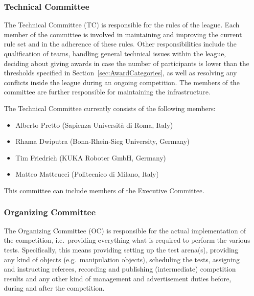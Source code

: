\subsubsection{\erlir Technical Committee}
\label{sssec:RoawTC}

The Technical Committee (TC) is responsible for the rules of the league. Each member of the committee is involved in maintaining and improving the current rule set and in the adherence of these rules. Other responsibilities include the qualification of teams, handling general technical issues within the league, deciding about giving awards in case the number of participants is lower than the thresholds specified in Section~\ref{sec:AwardCategories}, as well as resolving any conflicts inside the league during an ongoing competition. The members of the committee are further responsible for maintaining the \erlir infrastructure. 

The Technical Committee currently consists of the following members:
%
\begin{itemize}	\topsep-12pt\itemsep-2pt
\item Alberto Pretto (Sapienza Universit\`a di Roma, Italy)
\item Rhama Dwiputra (Bonn-Rhein-Sieg University, Germany)
\item Tim Friedrich (KUKA Roboter GmbH, Germany)
\item Matteo Matteucci (Politecnico di Milano, Italy)
\end{itemize}
%
This committee can include members of the Executive Committee.

\subsubsection{\erlir Organizing Committee}
\label{sssec:RoawOC}

The Organizing Committee (OC) is responsible for the actual implementation of the competition, i.e.~providing everything what is required to perform the various tests. 
Specifically, this means providing setting up the test arena(s), providing any kind of objects (e.g.~manipulation objects), scheduling the tests, assigning and instructing referees, recording and publishing (intermediate) competition results and any other kind of management and advertisement duties before, during and after the competition. 


